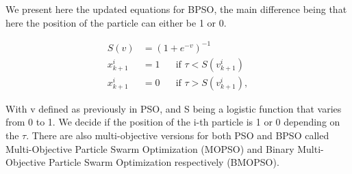 \documentclass{Configuration_Files/PoliMi3i_thesis}
\begin{document}
We present here the updated equations for BPSO, the main difference being that here the position of the particle can either be 1 or 0. \cite{abdullahEEGChannelSelection2022}


\begin{align}
S(v) &= \left(1+e^{-v}\right)^{-1} \\
x_{k+1}^i &=1 \:\:\:\:\:\: \text { if } \tau<S\left(v_{k+1}^i\right) \\
x_{k+1}^i &=0 \:\:\:\:\:\: \text { if } \tau>S\left(v_{k+1}^i\right),
\end{align}

With v defined as previously in PSO, and S being a logistic function that varies from 0 to 1.
We decide if the position of the i-th particle is 1 or 0 depending on the $\tau$.
There are also multi-objective versions for both PSO and BPSO called Multi-Objective Particle Swarm Optimization (MOPSO) and Binary Multi-Objective Particle Swarm Optimization respectively (BMOPSO). \cite{coellocoelloMOPSOProposalMultiple2002}





 
\end{document}
